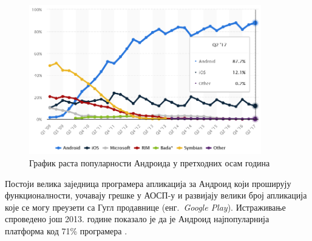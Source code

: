 \documentclass[12pt,oneside]{memoir}
\theoremstyle{remark}
\begin{document}
\begin{figure}[!ht]
\centering
\includegraphics[width=0.9\textwidth]{slike/android87.png}
\caption{График раста популарности Андроида у претходних осам година}
\label{fig:grafikrasta}
\end{figure}

Постоји велика заједница програмера апликација за Андроид који проширују функционалности, уочавају грешке у АОСП-у и развијају велики број апликација које се могу преузети са Гугл продавнице  (енг.~{\em Google Play}). Истраживање спроведено још 2013. године показало је да је Андроид најпопуларнија платформа код 71\% програмера \cite{embeddedandroid}.
\end{document}
